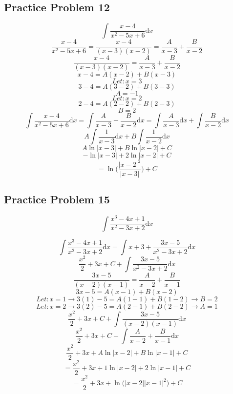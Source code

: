 \documentclass[letterpaper, 12pt]{article}
\newcommand*{\diff}{\mathrm{d}}
\begin{document}
\subsection*{Practice Problem 12}
\[ \int{\frac{x-4}{x^{2}-5x+6}\diff{x}} \]
\[ \frac{x-4}{x^{2}-5x+6} =
   \frac{x-4}{(x-3)(x-2)} = \frac{A}{x-3}+\frac{B}{x-2} \]
\[ \frac{x-4}{(x-3)(x-2)} = \frac{A}{x-3}+\frac{B}{x-2} \]
\[ x-4 = A(x-2)+B(x-3) \]
\[ Let: x = 3 \]
\[ 3-4 = A(3-2)+B(3-3) \]
\[ A = -1 \]
\[ Let: x = 2 \]
\[ 2-4 = A(2-2)+B(2-3) \]
\[ B = 2 \]
\[ \int{\frac{x-4}{x^{2}-5x+6}\diff{x}} =
   \int{\frac{A}{x-3}+\frac{B}{x-2}\diff{x}} =
   \int{\frac{A}{x-3}\diff{x}}+\int{\frac{B}{x-2}\diff{x}} \]
\[ A\int{\frac{1}{x-3}\diff{x}}+B\int{\frac{1}{x-2}\diff{x}} \]
\[ A\ln|x-3|+B\ln|x-2|+C \]
\[ -\ln|x-3|+2\ln|x-2|+C \]
\[ = \ln\bigg(\frac{|x-2|^{2}}{|x-3|}\bigg)+C \]

\subsection*{Practice Problem 15}
\[ \int{\frac{x^{3}-4x+1}{x^{2}-3x+2}\diff{x}} \]
\begin{center}
\end{center}
\[ \int{\frac{x^{3}-4x+1}{x^{2}-3x+2}\diff{x}} =
   \int{x+3+\frac{3x-5}{x^{2}-3x+2}\diff{x}} \]
\[ \frac{x^{2}}{2}+3x+C+\int{\frac{3x-5}{x^{2}-3x+2}\diff{x}} \]
\[ \frac{3x-5}{(x-2)(x-1)} = \frac{A}{x-2}+\frac{B}{x-1} \]
\[ 3x-5 = A(x-1)+B(x-2) \]
\[ Let: x = 1 \rightarrow 3(1)-5 = A(1-1)+B(1-2) \rightarrow B = 2 \]
\[ Let: x = 2 \rightarrow 3(2)-5 = A(2-1)+B(2-2) \rightarrow A = 1 \]
\[ \frac{x^{2}}{2}+3x+C+\int{\frac{3x-5}{(x-2)(x-1)}\diff{x}} \]
\[ \frac{x^{2}}{2}+3x+C+\int{\frac{A}{x-2}+\frac{B}{x-1}\diff{x}} \]
\[ \frac{x^{2}}{2}+3x+A\ln|x-2|+B\ln|x-1|+C \]
\[ = \frac{x^{2}}{2}+3x+1\ln|x-2|+2\ln|x-1|+C \]
\[ = \frac{x^{2}}{2}+3x+\ln\bigg(|x-2||x-1|^{2}\bigg)+C \]
\end{document}
